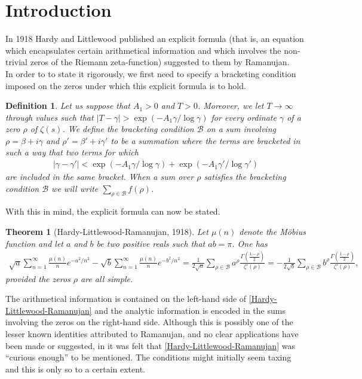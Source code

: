 \documentclass[11pt]{article}
\newtheorem{theorem}{Theorem}[section]
\newtheorem{definition}{Definition}[section]
\numberwithin{equation}{section}		 			%
\numberwithin{figure}{section}			 			%
\begin{document}
\section{Introduction}
\noindent In 1918 Hardy and Littlewood \cite{hardy_littlewood} published an explicit formula (that is, an equation which encapsulates certain arithmetical information and which involves the non-trivial zeros of the Riemann zeta-function) suggested to them by Ramanujan.\\
In order to to state it rigorously, we first need to specify a bracketing condition imposed on the zeros under which this explicit formula is to hold.
\begin{definition} \label{bracketingdefinition}
Let us suppose that $A_1 >0$ and $T>0$. Moreover, we let $T \to \infty$ through values such that $\left| {T - \gamma } \right| > \exp ( - {A_1}\gamma /\log \gamma )$ for every ordinate $\gamma$ of a zero $\rho$ of $\zeta(s)$. We define the bracketing condition $\mathcal{B}$ on a sum involving $\rho = \beta + i\gamma$ and $\rho' = \beta' + i\gamma'$ to be a summation where the terms are bracketed in such a way that two terms for which
\begin{align} \label{bracketinginequality}
\left| {\gamma  - \gamma '} \right| < \exp ( - {A_1}\gamma /\log \gamma ) + \exp ( - {A_1}\gamma '/\log \gamma ')
\end{align}
are included in the same bracket. When a sum over $\rho$ satisfies the bracketing condition $\mathcal{B}$ we will write $\sum_{\rho \in \mathcal{B}}{f(\rho)}$.
\end{definition}
\noindent With this in mind, the explicit formula can now be stated.
\begin{theorem}[Hardy-Littlewood-Ramanujan, 1918]
Let $\mu(n)$ denote the M\"{o}bius function and let $a$ and $b$ be two positive reals such that $ab = \pi$. One has
\begin{align} \label{Hardy-Littlewood-Ramanujan}
\sqrt a \sum\limits_{n = 1}^\infty  {\frac{{\mu (n)}}{n}{e^{ - {a^2}/{n^2}}}}  - \sqrt b \sum\limits_{n = 1}^\infty  {\frac{{\mu (n)}}{n}{e^{ - {b^2}/{n^2}}}}  = \frac{1}{{2\sqrt a }}\sum\limits_{\rho  \in \mathcal{B}} {{a^\rho }\frac{{\Gamma (\tfrac{{1 - \rho }}{2})}}{{\zeta '(\rho )}}}  =  - \frac{1}{{2\sqrt b }}\sum\limits_{\rho  \in \mathcal{B}} {{b^\rho }\frac{{\Gamma (\tfrac{{1 - \rho }}{2})}}{{\zeta '(\rho )}}},
\end{align}
provided the zeros $\rho$ are all simple.
\end{theorem}
\noindent The arithmetical information is contained on the left-hand side of \eqref{Hardy-Littlewood-Ramanujan} and the analytic information is encoded in the sums involving the zeros on the right-hand side. Although this is possibly one of the lesser known identities attributed to Ramanujan, and no clear applications have been made or suggested, in \cite{hardy_littlewood} it was felt that \eqref{Hardy-Littlewood-Ramanujan} was ``curious enough'' to be mentioned. The conditions might initially seem taxing and this is only so to a certain extent.\\
\end{document}
